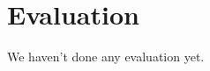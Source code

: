 \documentclass[../main.tex]{subfiles}
\begin{document}
\chapter{Evaluation}
We haven't done any evaluation yet.
\end{document}
